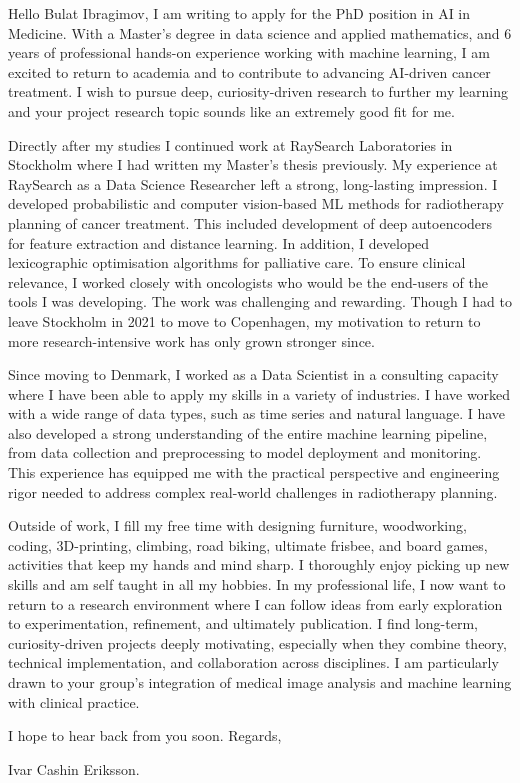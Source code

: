 \documentclass[11pt,a4paper]{moderncv}
\begin{document}
\makecvtitle
Hello Bulat Ibragimov, I am writing to apply for the PhD position in AI in Medicine. With a Master's degree in data science and applied mathematics, and 6 years of professional hands-on experience working with machine learning, I am excited to return to academia and to contribute to advancing AI-driven cancer treatment. I wish to pursue deep, curiosity-driven research to further my learning and your project research topic sounds like an extremely good fit for me. 

\hspace*{2em}
Directly after my studies I continued work at RaySearch Laboratories in Stockholm where I had written my Master's thesis previously. My experience at RaySearch as a Data Science Researcher left a strong, long-lasting impression. I developed probabilistic and computer vision-based ML methods for radiotherapy planning of cancer treatment. This included development of deep autoencoders for feature extraction and distance learning. In addition, I developed lexicographic optimisation algorithms for palliative care. To ensure clinical relevance, I worked closely with oncologists who would be the end-users of the tools I was developing. The work was challenging and rewarding. Though I had to leave Stockholm in 2021 to move to Copenhagen, my motivation to return to more research-intensive work has only grown stronger since. 

\hspace*{2em}
Since moving to Denmark, I worked as a Data Scientist in a consulting capacity where I have been able to apply my skills in a variety of industries. I have worked with a wide range of data types, such as time series and natural language. I have also developed a strong understanding of the entire machine learning pipeline, from data collection and preprocessing to model deployment and monitoring. This experience has equipped me with the practical perspective and engineering rigor needed to address complex real-world challenges in radiotherapy planning.

\hspace*{2em}
Outside of work, I fill my free time with designing furniture, woodworking,  coding, 3D-printing, climbing, road biking, ultimate frisbee, and board games, activities that keep my hands and mind sharp. I thoroughly enjoy picking up new skills and am self taught in all my hobbies. In my professional life, I now want to return to a research environment where I can follow ideas from early exploration to experimentation, refinement, and ultimately publication. I find long-term, curiosity-driven projects deeply motivating, especially when they combine theory, technical implementation, and collaboration across disciplines. I am particularly drawn to your group's integration of medical image analysis and machine learning with clinical practice.

\vspace{8 mm}
I hope to hear back from you soon. Regards, 

\vspace{3 mm} 
Ivar Cashin Eriksson.
\end{document}
